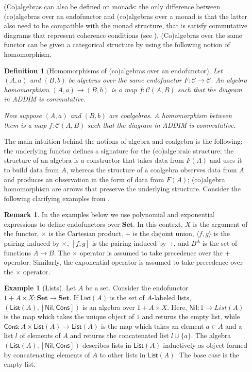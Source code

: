 \documentclass[11pt,a4paper,openright,twoside]{report}
\newcounter{mycounter}
\theoremstyle{plain}
\newtheorem{definition}[mycounter]{Definition}
\theoremstyle{definition}
\newtheorem{remark}[mycounter]{Remark}
\newtheorem{example}[mycounter]{Example}
\begin{document}
(Co)algebras can also be defined on monads: the only difference between (co)algebras over an endofunctor and (co)algebras over a monad is that the latter also need to be compatible with the monad structure, that is satisfy commutative diagrams that represent coherence conditions (see \cite{gavranovicposition}). (Co)algebras over the same functor can be given a categorical structure by using the following notion of homomorphism.

\begin{definition}[Homomorphisms of (co)algebras over an endofunctor]
  Let $(A,a)$ and $(B,b)$ be algebras over the same endofunctor $F: \mathcal{C} \to \mathcal{C}$. An algebra homomorphism $(A,a)\to (B,b)$ is a map $f: \mathcal{C}(A,B)$ such that the diagram in ADDIM is commutative.


  Now suppose $(A,a)$ and $(B,b)$ are coalgebras. A homomorphism between them is a map $f: \mathcal{C}(A,B)$ such that the diagram in ADDIM is commutative.
\end{definition}

The main intuition behind the notions of algebra and coalgebra is the following: the underlying functor defines a signature for the (co)algebraic structure; the structure of an algebra is a constructor that takes data from $F(A)$ and uses it to build data from $A$, whereas the structure of a coalgebra observes data from $A$ and produces an observation in the form of data from $F(A)$; (co)algebra homomorphism are arrows that preserve the underlying structure. Consider the following clarifying examples from \cite{gavranovicposition}.

\begin{remark}
  In the examples below we use polynomial and exponential expressions to define endofunctors over $\mathbf{Set}$. In this context, $X$ is the argument of the functor, $\times$ is the Cartesian product, $+$ is the disjoint union, $\langle f,g \rangle$ is the pairing induced by $\times$, $[f,g]$ is the pairing induced by $+$, and $B^A$ is the set of functions $A \to B$. The $\times$ operator is assumed to take precedence over the $+$ operator. Similarly, the exponential operator is assumed to take precedence over the $\times$ operator. 
\end{remark}


\begin{example}[Lists]
  \label{ex: lists}
  Let $A$ be a set. Consider the endofunctor $1 + A \times X: \mathbf{Set} \to \mathbf{Set}$. If $\mathsf{List}(A)$ is the set of $A$-labeled lists, $(\mathsf{List}(A), [\mathsf{Nil}, \mathsf{Cons}])$ is an algebra over $1 + A \times X$. Here, $\mathsf{Nil}: 1 \to {List}(A)$ is the map which takes the unique object of $1$ and returns the empty list, while $\mathsf{Cons}: A \times \mathsf{List}(A) \to \mathsf{List}(A)$ is the map which takes an element $a \in A$ and a list $l$ of elements of $A$ and returns the concatenated list $l \cup \{a\}$. The algebra $(\mathsf{List}(A), [\mathsf{Nil}, \mathsf{Cons}])$ describes lists in $\mathsf{List}(A)$ inductively as object formed by concatenating elements of $A$ to other lists in $\mathsf{List}(A)$. The base case is the empty list.
\end{example}
\end{document}
